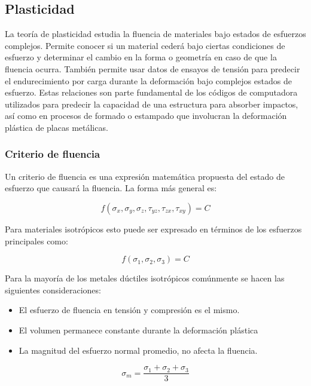 \subsection{Plasticidad}

La teoría de plasticidad estudia la fluencia de materiales bajo estados de esfuerzos complejos. Permite 
conocer si un material cederá bajo ciertas condiciones de esfuerzo y determinar el cambio en la forma o 
geometría en caso de que la fluencia ocurra. También permite usar datos de ensayos de tensión para predecir 
el endurecimiento por carga durante la deformación bajo complejos estados de esfuerzo. Estas relaciones 
son parte fundamental de los códigos de computadora utilizados para predecir la capacidad de una estructura 
para absorber impactos, así como en procesos de formado o estampado que involucran la deformación plástica de 
placas metálicas.

\subsubsection{Criterio de fluencia}

Un criterio de fluencia es una expresión matemática propuesta del estado de esfuerzo que causará la fluencia. La forma más general es:

\begin{equation}
f(\sigma_x,\sigma_y, \sigma_z, \tau_{yz}, \tau_{zx}, \tau_{xy} ) = C 
\end{equation}

Para materiales isotrópicos esto puede ser expresado en términos de los esfuerzos principales como:

\begin{equation}
f(\sigma_1,\sigma_2,\sigma_3 )=C
\end{equation}

Para la mayoría de los metales dúctiles isotrópicos comúnmente se hacen las siguientes consideraciones:

\begin{itemize}
\item El esfuerzo de fluencia en tensión y compresión es el mismo.
\item El volumen permanece constante durante la deformación plástica
\item La magnitud del esfuerzo normal promedio, no afecta la fluencia.
\end{itemize}

\begin{equation}
\sigma_m=\frac{\sigma_1+\sigma_2+\sigma_3}{3}
\end{equation}

